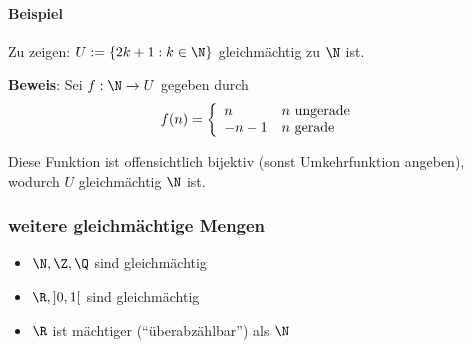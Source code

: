 \paragraph{Beispiel}
Zu zeigen: $U := \{ 2k + 1: k \in \N \}$ gleichmächtig zu $\N$ ist.

\textbf{Beweis}: Sei $f: \N \rightarrow U$ gegeben durch
\begin{equation*}
f(n) = \left\{
	\begin{array}{l l}
		n & n \text{ ungerade}\\
		-n - 1 & n \text{ gerade}
	\end{array}
\right.
\end{equation*}

Diese Funktion ist offensichtlich bijektiv (sonst Umkehrfunktion angeben), wodurch $U$ gleichmächtig $\N$ ist.

\subsubsection{weitere gleichmächtige Mengen}
\begin{itemize}
	\item $\N, \Z, \Q$ sind gleichmächtig
	\item $\R, ]0,1[$ sind gleichmächtig
	\item $\R$ ist mächtiger (``überabzählbar'') als $\N$
\end{itemize}
